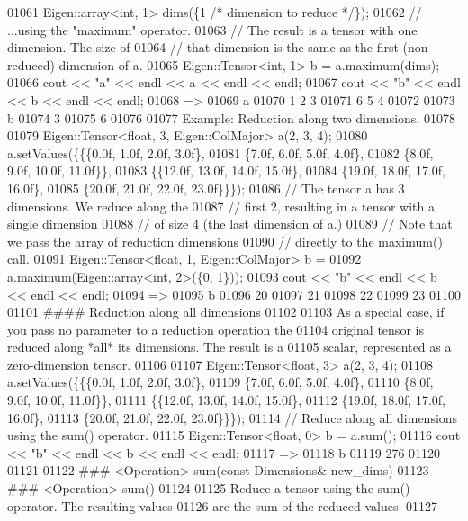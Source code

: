 \begin{DoxyCode}
01061     Eigen::array<int, 1> dims(\{1 /* dimension to reduce */\});
01062     // ...using the "maximum" operator.
01063     // The result is a tensor with one dimension.  The size of
01064     // that dimension is the same as the first (non-reduced) dimension of a.
01065     Eigen::Tensor<int, 1> b = a.maximum(dims);
01066     cout << "a" << endl << a << endl << endl;
01067     cout << "b" << endl << b << endl << endl;
01068     =>
01069     a
01070     1 2 3
01071     6 5 4
01072 
01073     b
01074     3
01075     6
01076 
01077 Example: Reduction along two dimensions.
01078 
01079     Eigen::Tensor<float, 3, Eigen::ColMajor> a(2, 3, 4);
01080     a.setValues(\{\{\{0.0f, 1.0f, 2.0f, 3.0f\},
01081                   \{7.0f, 6.0f, 5.0f, 4.0f\},
01082                   \{8.0f, 9.0f, 10.0f, 11.0f\}\},
01083                  \{\{12.0f, 13.0f, 14.0f, 15.0f\},
01084                   \{19.0f, 18.0f, 17.0f, 16.0f\},
01085                   \{20.0f, 21.0f, 22.0f, 23.0f\}\}\});
01086     // The tensor a has 3 dimensions.  We reduce along the
01087     // first 2, resulting in a tensor with a single dimension
01088     // of size 4 (the last dimension of a.)
01089     // Note that we pass the array of reduction dimensions
01090     // directly to the maximum() call.
01091     Eigen::Tensor<float, 1, Eigen::ColMajor> b =
01092         a.maximum(Eigen::array<int, 2>(\{0, 1\}));
01093     cout << "b" << endl << b << endl << endl;
01094     =>
01095     b
01096     20
01097     21
01098     22
01099     23
01100 
01101 #### Reduction along all dimensions
01102 
01103 As a special case, if you pass no parameter to a reduction operation the
01104 original tensor is reduced along *all* its dimensions.  The result is a
01105 scalar, represented as a zero-dimension tensor.
01106 
01107     Eigen::Tensor<float, 3> a(2, 3, 4);
01108     a.setValues(\{\{\{0.0f, 1.0f, 2.0f, 3.0f\},
01109                   \{7.0f, 6.0f, 5.0f, 4.0f\},
01110                   \{8.0f, 9.0f, 10.0f, 11.0f\}\},
01111                  \{\{12.0f, 13.0f, 14.0f, 15.0f\},
01112                   \{19.0f, 18.0f, 17.0f, 16.0f\},
01113                   \{20.0f, 21.0f, 22.0f, 23.0f\}\}\});
01114     // Reduce along all dimensions using the sum() operator.
01115     Eigen::Tensor<float, 0> b = a.sum();
01116     cout << "b" << endl << b << endl << endl;
01117     =>
01118     b
01119     276
01120 
01121 
01122 ### <Operation> sum(const Dimensions& new\_dims)
01123 ### <Operation> sum()
01124 
01125 Reduce a tensor using the sum() operator.  The resulting values
01126 are the sum of the reduced values.
01127 

\end{DoxyCode}
